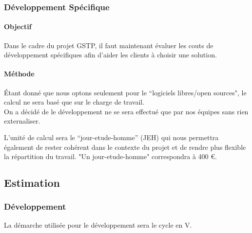         \subsubsection{Développement Spécifique}
        \paragraph{Objectif}

        Dans le cadre du projet GSTP, il faut maintenant évaluer les couts de développement spécifiques afin d'aider les clients à choisir une solution.

        \paragraph{Méthode}

        Étant donné que nous optons seulement pour le ``logiciels libres/open sources", le calcul ne sera basé que sur le charge de travail.\\

        On a décidé de le développement ne se sera effectué que par nos équipes sans rien externaliser.

        L’unité de calcul sera le ``jour-etude-homme'' (JEH) qui nous permettra également de rester cohérent dans le contexte du projet et de rendre plus flexible la répartition du travail. "Un jour-etude-homme" correspondra à 400 €.

    \subsection{Estimation}

    \subsubsection{Développement}
    La démarche utilisée pour le développement sera le cycle en V. 

